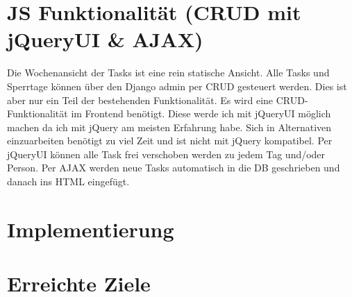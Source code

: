 \section{JS Funktionalität (CRUD mit jQueryUI \& AJAX) }
Die Wochenansicht der Tasks ist eine rein statische Ansicht.
Alle Tasks und Sperrtage können über den Django admin per CRUD gesteuert werden. Dies ist aber nur ein Teil der bestehenden Funktionalität.
Es wird eine CRUD-Funktionalität im Frontend benötigt. Diese werde ich mit jQueryUI möglich machen da ich mit jQuery am meisten Erfahrung habe.
Sich in Alternativen einzuarbeiten benötigt zu viel Zeit und ist nicht mit jQuery kompatibel.
Per jQueryUI können alle Task frei verschoben werden zu jedem Tag und/oder Person.
Per AJAX werden neue Tasks automatisch in die DB geschrieben und danach ins HTML eingefügt.
\section{Implementierung}
\section{Erreichte Ziele}
